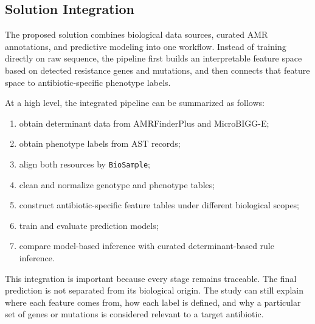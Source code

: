 \subsection{Solution Integration}

The proposed solution combines biological data sources, curated AMR annotations, and predictive modeling into one workflow. Instead of training directly on raw sequence, the pipeline first builds an interpretable feature space based on detected resistance genes and mutations, and then connects that feature space to antibiotic-specific phenotype labels.

At a high level, the integrated pipeline can be summarized as follows:

\begin{enumerate}[label=\arabic*.]
    \item obtain determinant data from AMRFinderPlus and MicroBIGG-E;
    \item obtain phenotype labels from AST records;
    \item align both resources by \texttt{BioSample};
    \item clean and normalize genotype and phenotype tables;
    \item construct antibiotic-specific feature tables under different biological scopes;
    \item train and evaluate prediction models;
    \item compare model-based inference with curated determinant-based rule inference.
\end{enumerate}

This integration is important because every stage remains traceable. The final prediction is not separated from its biological origin. The study can still explain where each feature comes from, how each label is defined, and why a particular set of genes or mutations is considered relevant to a target antibiotic.
